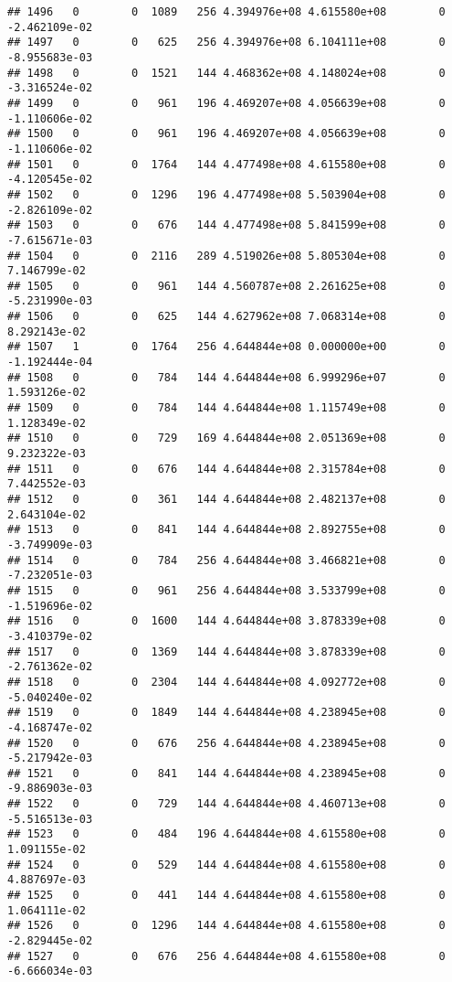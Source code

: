 \documentclass[
]{article}
\begin{document}
\begin{enumerate}
\begin{verbatim}
## 1496   0        0  1089   256 4.394976e+08 4.615580e+08        0 -2.462109e-02
## 1497   0        0   625   256 4.394976e+08 6.104111e+08        0 -8.955683e-03
## 1498   0        0  1521   144 4.468362e+08 4.148024e+08        0 -3.316524e-02
## 1499   0        0   961   196 4.469207e+08 4.056639e+08        0 -1.110606e-02
## 1500   0        0   961   196 4.469207e+08 4.056639e+08        0 -1.110606e-02
## 1501   0        0  1764   144 4.477498e+08 4.615580e+08        0 -4.120545e-02
## 1502   0        0  1296   196 4.477498e+08 5.503904e+08        0 -2.826109e-02
## 1503   0        0   676   144 4.477498e+08 5.841599e+08        0 -7.615671e-03
## 1504   0        0  2116   289 4.519026e+08 5.805304e+08        0  7.146799e-02
## 1505   0        0   961   144 4.560787e+08 2.261625e+08        0 -5.231990e-03
## 1506   0        0   625   144 4.627962e+08 7.068314e+08        0  8.292143e-02
## 1507   1        0  1764   256 4.644844e+08 0.000000e+00        0 -1.192444e-04
## 1508   0        0   784   144 4.644844e+08 6.999296e+07        0  1.593126e-02
## 1509   0        0   784   144 4.644844e+08 1.115749e+08        0  1.128349e-02
## 1510   0        0   729   169 4.644844e+08 2.051369e+08        0  9.232322e-03
## 1511   0        0   676   144 4.644844e+08 2.315784e+08        0  7.442552e-03
## 1512   0        0   361   144 4.644844e+08 2.482137e+08        0  2.643104e-02
## 1513   0        0   841   144 4.644844e+08 2.892755e+08        0 -3.749909e-03
## 1514   0        0   784   256 4.644844e+08 3.466821e+08        0 -7.232051e-03
## 1515   0        0   961   256 4.644844e+08 3.533799e+08        0 -1.519696e-02
## 1516   0        0  1600   144 4.644844e+08 3.878339e+08        0 -3.410379e-02
## 1517   0        0  1369   144 4.644844e+08 3.878339e+08        0 -2.761362e-02
## 1518   0        0  2304   144 4.644844e+08 4.092772e+08        0 -5.040240e-02
## 1519   0        0  1849   144 4.644844e+08 4.238945e+08        0 -4.168747e-02
## 1520   0        0   676   256 4.644844e+08 4.238945e+08        0 -5.217942e-03
## 1521   0        0   841   144 4.644844e+08 4.238945e+08        0 -9.886903e-03
## 1522   0        0   729   144 4.644844e+08 4.460713e+08        0 -5.516513e-03
## 1523   0        0   484   196 4.644844e+08 4.615580e+08        0  1.091155e-02
## 1524   0        0   529   144 4.644844e+08 4.615580e+08        0  4.887697e-03
## 1525   0        0   441   144 4.644844e+08 4.615580e+08        0  1.064111e-02
## 1526   0        0  1296   144 4.644844e+08 4.615580e+08        0 -2.829445e-02
## 1527   0        0   676   256 4.644844e+08 4.615580e+08        0 -6.666034e-03

\end{verbatim}
\end{enumerate}
\end{document}
